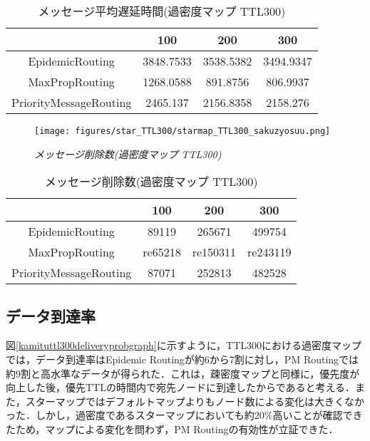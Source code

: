\documentclass[11pt]{icsthesis}
\begin{document}
\begin{table}[H]
 \begin{center}
      \caption[]{メッセージ平均遅延時間(過密度マップ TTL300)}
      \label{kamituttl300latencyavg}
      \begin{tabular}{|c|c|c|c|}
\hline
&100&200&300\\
\hline
EpidemicRouting&3848.7533&3538.5382&3494.9347\\
\hline
MaxPropRouting&1268.0588&891.8756&806.9937\\
\hline
PriorityMessageRouting&2465.137&2156.8358&2158.276\\
\hline
      \end{tabular}
    \end{center}
\end{table}

\begin{figure}[h]
\centering
\texttt{[image: figures/star\_TTL300/starmap\_TTL300\_sakuzyosuu.png]}
\caption[]{\it{メッセージ削除数(過密度マップ TTL300)}}
\label{kamituttl300droppedgraph}
\end{figure}

\begin{table}[H]
 \begin{center}
      \caption[]{メッセージ削除数(過密度マップ TTL300)}
      \label{kamituttl300dropped}
      \begin{tabular}{|c|c|c|c|}
\hline
&100&200&300\\
\hline
EpidemicRouting&89119&265671&499754\\
\hline
MaxPropRouting&re65218&re150311&re243119\\
\hline
PriorityMessageRouting&87071&252813&482528\\
\hline
      \end{tabular}
    \end{center}
\end{table}

\subsection{データ到達率}
図\ref{kamituttl300deliveryprobgraph}に示すように，TTL300における過密度マップでは，データ到達率はEpidemic Routingが約6から7割に対し，PM Routingでは約9割と高水準なデータが得られた．これは，疎密度マップと同様に，優先度が向上した後，優先TTLの時間内で宛先ノードに到達したからであると考える．また，スターマップではデフォルトマップよりもノード数による変化は大きくなかった．しかし，過密度であるスターマップにおいても約20\%高いことが確認できたため，マップによる変化を問わず，PM Routingの有効性が立証できた．
\end{document}
